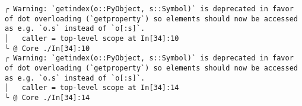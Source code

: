 \documentclass[11pt]{article}
\begin{document}
    \begin{center}
    \end{center}
    { \hspace*{\fill} \\}
    
    \begin{center}
    \end{center}
    { \hspace*{\fill} \\}
    
    \begin{center}
    \end{center}
    { \hspace*{\fill} \\}
    
    \begin{center}
    \end{center}
    { \hspace*{\fill} \\}
    
    \begin{center}
    \end{center}
    { \hspace*{\fill} \\}
    
    \begin{center}
    \end{center}
    { \hspace*{\fill} \\}
    
    \begin{center}
    \end{center}
    { \hspace*{\fill} \\}
    
    \begin{Verbatim}[commandchars=\\\{\}]
┌ Warning: `getindex(o::PyObject, s::Symbol)` is deprecated in favor of dot overloading (`getproperty`) so elements should now be accessed as e.g. `o.s` instead of `o[:s]`.
│   caller = top-level scope at In[34]:10
└ @ Core ./In[34]:10
┌ Warning: `getindex(o::PyObject, s::Symbol)` is deprecated in favor of dot overloading (`getproperty`) so elements should now be accessed as e.g. `o.s` instead of `o[:s]`.
│   caller = top-level scope at In[34]:14
└ @ Core ./In[34]:14

    \end{Verbatim}


    
    
    
    
\end{document}
